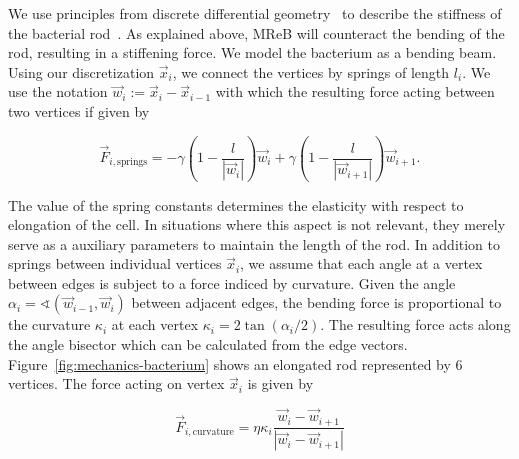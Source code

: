 \documentclass{article}
\begin{document}
We use principles from discrete differential geometry~\cite{bobenko2008discrete} to describe the
stiffness of the bacterial rod~\cite{Amir2014_2}.
As explained above, MReB will counteract the bending of the rod, resulting in a stiffening force.
We model the bacterium as a bending beam.
Using our discretization $\vec{x}_i$, we connect the vertices by springs of length $l_i$.
We use the notation $\vec{w}_i:=\vec{x}_i-\vec{x}_{i-1}$ with which the resulting force acting
between two vertices if given by

\begin{equation}
    \vec{F}_{i,\text{springs}} =
        -\gamma\left(1 - \frac{l}{\left|\vec{w}_i\right|}\right) \vec{w}_i
        + \gamma\left(1 - \frac{l}{\left|\vec{w}_{i+1}\right|}\right) \vec{w}_{i+1}.
\end{equation}

The value of the spring constants determines the elasticity with respect to elongation of the cell.
In situations where this aspect is not relevant, they merely serve as a auxiliary parameters to
maintain the length of the rod.
In addition to springs between individual vertices $\vec{x}_i$, we assume that each angle at a
vertex between edges is subject to a force indiced by curvature.
Given the angle $\alpha_i = \sphericalangle(\vec{w}_{i-1},\vec{w}_i)$ between adjacent edges,
the bending force is proportional to the curvature $\kappa_i$ at each vertex
$\kappa_i = 2\tan(\alpha_i/2)$.
The resulting force acts along the angle bisector which can be calculated from the edge vectors.
Figure~\ref{fig:mechanics-bacterium} shows an elongated rod represented by $6$ vertices.
The force acting on vertex $\vec{x}_i$ is given by

\begin{equation}
    \vec{F}_{i,\text{curvature}} = \eta\kappa_i
        \frac{\vec{w}_i - \vec{w}_{i+1}}{|\vec{w}_i-\vec{w}_{i+1}|}
\end{equation}
\end{document}
